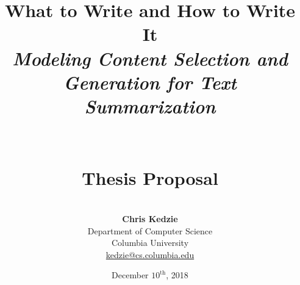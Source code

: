 \documentclass[12pt]{article}
\title{\textbf{What to Write and How to Write It}\\
       \textit{\large Modeling Content Selection and Generation for Text Summarization}\\
       ~\\
       ~\\\large\textbf{Thesis Proposal}}
\author{~\\
        \textbf{Chris Kedzie}\\
        Department of Computer Science\\
        Columbia University\\
        \url{kedzie@cs.columbia.edu}}
\date{December $10^{\textrm{th}}$, 2018}
\begin{document}
\maketitle

\pagebreak

\renewcommand{\thepage}{\roman{page}}
\setcounter{page}{1}

\begin{abstract}
  
\end{abstract}

\pagebreak

\tableofcontents
\newpage





\newpage

\renewcommand{\thepage}{\arabic{page}}
\setcounter{page}{1}

\def\highlevel{true}


%



\pagebreak







\end{document}
